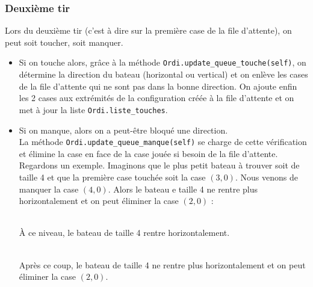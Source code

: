 \subsubsection{Deuxième tir}
Lors du deuxième tir (c'est à dire sur la première case de la file d'attente), on peut soit toucher, soit manquer.
\begin{itemize}
\item Si on touche alors, grâce à la méthode \texttt{Ordi.update\_queue\_touche(self)}, on détermine la direction du bateau (horizontal ou vertical)  et on enlève les cases de la file d'attente qui ne sont pas dans la bonne direction. On ajoute enfin les 2 cases aux extrémités de la configuration créée à la file d'attente et on met à jour la liste \texttt{Ordi.liste\_touches}. 
\item Si on manque, alors on a peut-être bloqué une direction.\\
La méthode \texttt{Ordi.update\_queue\_manque(self)} se charge de cette vérification et élimine la case en face de la case jouée si besoin de la file d'attente.
Regardons un exemple. Imaginons que le plus petit bateau à trouver soit de taille 4 et que la première case touchée soit la case $(3,0)$. Nous venons de manquer la case $(4,0)$. Alors le bateau e taille 4 ne rentre plus horizontalement et on peut éliminer la case $(2,0)$ :

\begin{center}
\\
À ce niveau, le bateau de taille 4 rentre horizontalement.
\end{center}
\medskip
\begin{center}
\\
Après ce coup, le bateau de taille 4 ne rentre plus horizontalement et on peut éliminer la case $(2,0)$.
\end{center}
  
\end{itemize}   

